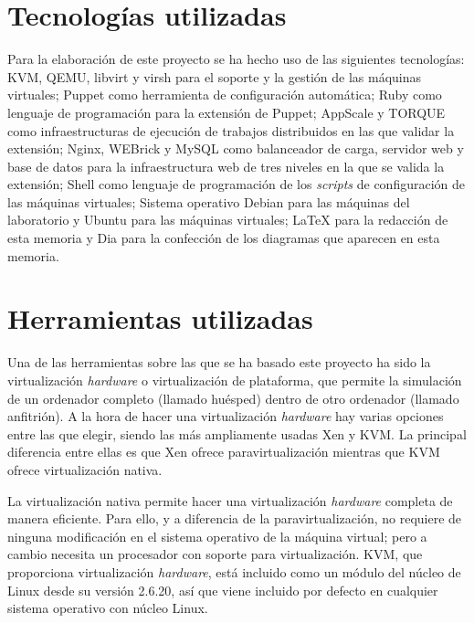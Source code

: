 \section{Tecnologías utilizadas}


Para la elaboración de este proyecto se ha hecho uso de las siguientes tecnologías: KVM, QEMU, libvirt y virsh para el soporte y la gestión de las máquinas virtuales; Puppet como herramienta de configuración automática; Ruby como lenguaje de programación para la extensión de Puppet; AppScale y TORQUE como infraestructuras de ejecución de trabajos distribuidos en las que validar la extensión; Nginx, WEBrick y MySQL como balanceador de carga, servidor web y base de datos para la infraestructura web de tres niveles en la que se valida la extensión; Shell como lenguaje de programación de los \emph{scripts} de configuración de las máquinas virtuales; Sistema operativo Debian para las máquinas del laboratorio y Ubuntu para las máquinas virtuales; \LaTeX{} \cite{manual:latex} para la redacción de esta memoria y Dia para la confección de los diagramas que aparecen en esta memoria.


\section{Herramientas utilizadas}


Una de las herramientas sobre las que se ha basado este proyecto ha sido la virtualización \emph{hardware} o virtualización de plataforma, que permite la simulación de un ordenador completo (llamado huésped) dentro de otro ordenador (llamado anfitrión). A la hora de hacer una virtualización \emph{hardware} hay varias opciones entre las que elegir, siendo las más ampliamente usadas Xen y KVM. La principal diferencia entre ellas es que Xen ofrece paravirtualización mientras que KVM ofrece virtualización nativa.

La virtualización nativa permite hacer una virtualización \emph{hardware} completa de manera eficiente. Para ello, y a diferencia de la paravirtualización, no requiere de ninguna modificación en el sistema operativo de la máquina virtual; pero a cambio necesita un procesador con soporte para virtualización. KVM, que proporciona virtualización \emph{hardware}, está incluido como un módulo del núcleo de Linux desde su versión 2.6.20, así que viene incluido por defecto en cualquier sistema operativo con núcleo Linux.

